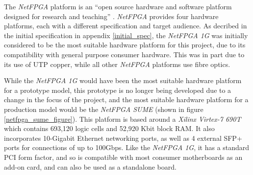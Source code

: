 

The \textit{NetFPGA} platform is an ``open source hardware and software platform designed for research and teaching'' \cite{NetFPGA}.
\textit{NetFPGA} provides four hardware platforms, each with a different specification and target audience. As decribed in the initial specification in appendix \ref{initial_spec}, the \textit{NetFPGA 1G} was initially considered to be the most suitable hardware platform for this project, due to its compatibility with general purpose consumer hardware.
This was in part due to its use of UTP copper, while all other \textit{NetFPGA} platforms use fibre optics.

While the \textit{NetFPGA 1G} would have been the most suitable hardware platform for a prototype model, this prototype is no longer being developed due to a change in the focus of the project, and the most suitable hardware platform for a production model would be the \textit{NetFPGA SUME} (shown in figure \ref{netfpga_sume_figure}). This platform is based around a \textit{Xilinx Virtex-7 690T} \cite{virtex7-690t} which contains 693,120 logic cells and 52,920 Kbit block RAM. It also incorporates 10-Gigabit Ethernet networking ports, as well as 4 external SFP+ ports for connections of up to 100Gbps. Like the \textit{NetFPGA 1G}, it has a standard PCI form factor, and so is compatible with most consumer motherboards as an add-on card, and can also be used as a standalone board.


